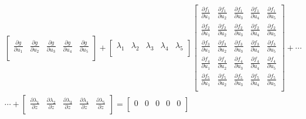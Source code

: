 \documentclass[11pt]{article}
\begin{document}
\begin{enumerate}
	\begin{equation}
		\begin{split}
			& \left[ {\begin{matrix}
					{\frac{{\partial g}}{{\partial {u_1}}}} & {\frac{{\partial g}}{{\partial {u_2}}}} & {\frac{{\partial g}}{{\partial {u_3}}}} & {\frac{{\partial g}}{{\partial {u_4}}}} & {\frac{{\partial g}}{{\partial {u_5}}}}  \\ 
			\end{matrix} } \right] + \left[ {\begin{matrix}
					{{\lambda _1}} & {{\lambda _2}} & {{\lambda _3}} & {{\lambda _4}} & {{\lambda _5}}   \\ 
			\end{matrix} } \right]\left[ {\begin{matrix}
					{\frac{{\partial {f_1}}}{{\partial {u_1}}}} & {\frac{{\partial {f_1}}}{{\partial {u_2}}}} & {\frac{{\partial {f_1}}}{{\partial {u_3}}}} & {\frac{{\partial {f_1}}}{{\partial {u_4}}}} & {\frac{{\partial {f_1}}}{{\partial {u_5}}}} \\ 
					{\frac{{\partial {f_2}}}{{\partial {u_1}}}} & {\frac{{\partial {f_2}}}{{\partial {u_2}}}} & {\frac{{\partial {f_2}}}{{\partial {u_3}}}} & {\frac{{\partial {f_2}}}{{\partial {u_4}}}} & {\frac{{\partial {f_2}}}{{\partial {u_5}}}}  \\ 
					{\frac{{\partial {f_3}}}{{\partial {u_1}}}} & {\frac{{\partial {f_3}}}{{\partial {u_2}}}} & {\frac{{\partial {f_3}}}{{\partial {u_3}}}} & {\frac{{\partial {f_3}}}{{\partial {u_4}}}} & {\frac{{\partial {f_3}}}{{\partial {u_5}}}}  \\ 
					{\frac{{\partial {f_4}}}{{\partial {u_1}}}} & {\frac{{\partial {f_4}}}{{\partial {u_2}}}} & {\frac{{\partial {f_4}}}{{\partial {u_3}}}} & {\frac{{\partial {f_4}}}{{\partial {u_4}}}} & {\frac{{\partial {f_4}}}{{\partial {u_5}}}}  \\ 
					{\frac{{\partial {f_5}}}{{\partial {u_1}}}} & {\frac{{\partial {f_5}}}{{\partial {u_2}}}} & {\frac{{\partial {f_5}}}{{\partial {u_3}}}} & {\frac{{\partial {f_5}}}{{\partial {u_4}}}} & {\frac{{\partial {f_5}}}{{\partial {u_5}}}}  \\  
			\end{matrix} } \right] + \cdots \\
			& \cdots + \left[ {\begin{matrix}
					{\frac{{\partial {\lambda _1}}}{{\partial z}}} & {\frac{{\partial {\lambda _2}}}{{\partial z}}} & {\frac{{\partial {\lambda _3}}}{{\partial z}}} & {\frac{{\partial {\lambda _4}}}{{\partial z}}} & {\frac{{\partial {\lambda _5}}}{{\partial z}}}  \\ 
			\end{matrix} } \right]= \left[ {\begin{matrix}
					0 & 0 & 0 & 0 & 0  \\ 
			\end{matrix} } \right]
		\end{split}
	\end{equation}
	

\end{enumerate}
\end{document}
